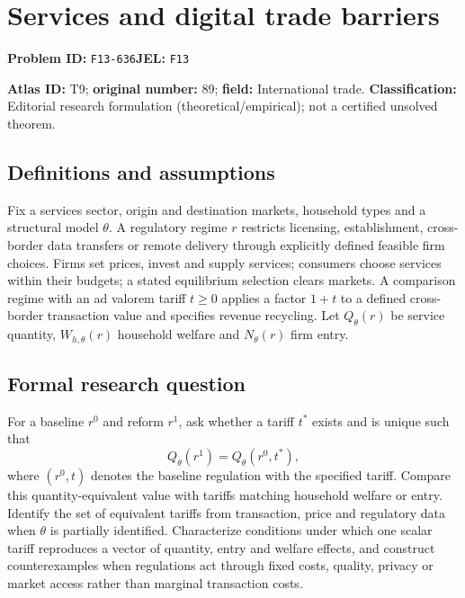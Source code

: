 \documentclass[11pt,a4paper]{article}
\begin{document}
\section*{Services and digital trade barriers}
\textbf{Problem ID:} \texttt{F13-636}\quad \textbf{JEL:} \texttt{F13}\par
\label{problem:OP-0089}
\label{atlas:prob:T9}

\noindent\textbf{Atlas ID:} T9; \textbf{original number:} 89; \textbf{field:} International trade. \textbf{Classification:} Editorial research formulation (theoretical/empirical); not a certified unsolved theorem.

\subsection*{Definitions and assumptions}
Fix a services sector, origin and destination markets, household types and a structural model $\theta$. A regulatory regime $r$ restricts licensing, establishment, cross-border data transfers or remote delivery through explicitly defined feasible firm choices. Firms set prices, invest and supply services; consumers choose services within their budgets; a stated equilibrium selection clears markets. A comparison regime with an ad valorem tariff $t\ge0$ applies a factor $1+t$ to a defined cross-border transaction value and specifies revenue recycling. Let $Q_\theta(r)$ be service quantity, $W_{h,\theta}(r)$ household welfare and $N_\theta(r)$ firm entry.

\subsection*{Formal research question}
For a baseline $r^0$ and reform $r^1$, ask whether a tariff $t^*$ exists and is unique such that
\[
 Q_\theta(r^1)=Q_\theta(r^0,t^*),
\]
where $(r^0,t)$ denotes the baseline regulation with the specified tariff. Compare this quantity-equivalent value with tariffs matching household welfare or entry. Identify the set of equivalent tariffs from transaction, price and regulatory data when $\theta$ is partially identified. Characterize conditions under which one scalar tariff reproduces a vector of quantity, entry and welfare effects, and construct counterexamples when regulations act through fixed costs, quality, privacy or market access rather than marginal transaction costs.
\end{document}
